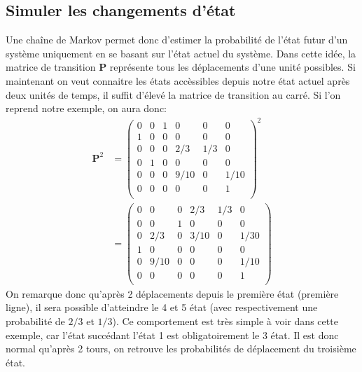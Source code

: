 \documentclass[letterpaper]{article}
\begin{document}
  \subsection{Simuler les changements d'état}
    Une chaîne de Markov permet donc d'estimer la probabilité de l'état
    futur d'un système uniquement en se basant sur l'état actuel du système.
    Dans cette idée, la matrice de transition $\mathbf{P}$ représente tous les
    déplacements d'une unité possibles.  Si maintenant on veut connaitre
    les états accèssibles depuis notre état actuel après deux unités de temps,
    il suffit d'élevé la matrice de transition au carré.  Si l'on reprend
    notre exemple, on aura donc:
    \begin{align*}
    \mathbf{P}^2 &= 
      \begin{pmatrix}
	0 & 0 & 1 & 0    & 0   & 0    \\
	1 & 0 & 0 & 0    & 0   & 0    \\
	0 & 0 & 0 & 2/3  & 1/3 & 0    \\
	0 & 1 & 0 & 0    & 0   & 0    \\
	0 & 0 & 0 & 9/10 & 0   & 1/10 \\
	0 & 0 & 0 & 0    & 0   & 1    \\
      \end{pmatrix}^2\\
      &= 
      \begin{pmatrix}
        0 & 0    & 0 & 2/3  & 1/3 & 0    \\
	0 & 0    & 1 & 0    & 0   & 0    \\
	0 & 2/3  & 0 & 3/10 & 0   & 1/30 \\
	1 & 0    & 0 & 0    & 0   & 0    \\
	0 & 9/10 & 0 & 0    & 0   & 1/10 \\
	0 & 0    & 0 & 0    & 0   & 1    \\
      \end{pmatrix}
    \end{align*}
    On remarque donc qu'après 2 déplacements depuis le première état (première
    ligne), il sera possible d'atteindre le 4 et 5 état (avec 
    respectivement une probabilité de $2/3$ et $1/3$).  Ce comportement est
    très simple à voir dans cette exemple, car l'état succédant l'état 1 est
    obligatoirement le 3 état.  Il est donc normal qu'après 2 tours,
    on retrouve les probabilités de déplacement du troisième état.
    
\end{document}
